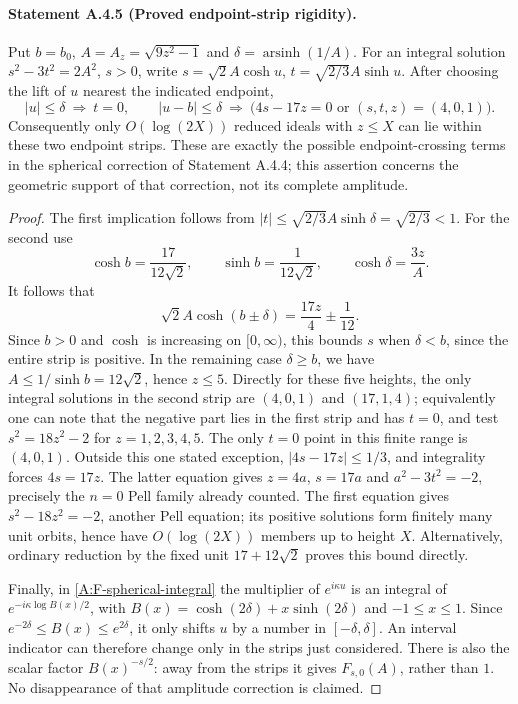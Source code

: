 \paragraph{Statement A.4.5 (Proved endpoint-strip rigidity).}
Put $b=b_0$, $A=A_z=\sqrt{9z^2-1}$ and
$\delta=\operatorname{arsinh}(1/A)$. For an integral solution
$s^2-3t^2=2A^2$, $s>0$, write
$s=\sqrt2A\cosh u$, $t=\sqrt{2/3}A\sinh u$.
After choosing the lift of $u$ nearest the indicated endpoint,
\[
 |u|\leq\delta\ \Longrightarrow\ t=0,
 \qquad |u-b|\leq\delta\ \Longrightarrow\
 \bigl(4s-17z=0\text{ or }(s,t,z)=(4,0,1)\bigr).
\]
Consequently only $O(\log(2X))$ reduced ideals with $z\leq X$
can lie within these two endpoint strips. These are exactly the
possible endpoint-crossing terms in the spherical correction of
Statement A.4.4; this assertion concerns the geometric support of
that correction, not its complete amplitude.
\begin{proof}
The first implication follows from
$|t|\leq\sqrt{2/3}A\sinh\delta=\sqrt{2/3}<1$.
For the second use
\[
 \cosh b=\frac{17}{12\sqrt2},\qquad
 \sinh b=\frac1{12\sqrt2},\qquad
 \cosh\delta=\frac{3z}{A}.
\]
It follows that
\[
 \sqrt2A\cosh(b\pm\delta)=\frac{17z}{4}\pm\frac1{12}.
\]
Since $b>0$ and $\cosh$ is increasing on $[0,\infty)$, this
bounds $s$ when $\delta<b$, since the entire strip is positive.
In the remaining case $\delta\geq b$, we have $A\leq
1/\sinh b=12\sqrt2$, hence $z\leq5$. Directly for these five
heights, the only integral solutions in the second strip are
$(4,0,1)$ and $(17,1,4)$; equivalently one can note that the negative part lies
in the first strip and has $t=0$, and test $s^2=18z^2-2$ for
$z=1,2,3,4,5$. The only $t=0$ point in this finite range is $(4,0,1)$.
Outside this one stated exception, $|4s-17z|\leq1/3$, and integrality forces
$4s=17z$. The latter equation gives $z=4a$, $s=17a$ and
$a^2-3t^2=-2$, precisely the $n=0$ Pell family already counted.
The first equation gives $s^2-18z^2=-2$, another Pell equation;
its positive solutions form finitely many unit orbits, hence have
$O(\log(2X))$ members up to height $X$. Alternatively, ordinary
reduction by the fixed unit $17+12\sqrt2$ proves this bound directly.

Finally, in \eqref{A:F-spherical-integral} the multiplier of
$e^{i\kappa u}$ is an integral of
$e^{-i\kappa\log B(x)/2}$, with
$B(x)=\cosh(2\delta)+x\sinh(2\delta)$ and $-1\leq x\leq1$.
Since $e^{-2\delta}\leq B(x)\leq e^{2\delta}$, it only shifts
$u$ by a number in $[-\delta,\delta]$. An interval indicator
can therefore change only in the strips just considered. There
is also the scalar factor $B(x)^{-s/2}$: away from the strips
it gives $F_{s,0}(A)$, rather than $1$. No disappearance of that
amplitude correction is claimed.
\end{proof}

